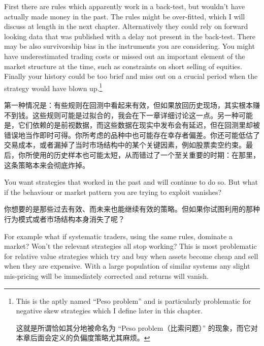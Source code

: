 \begin{englishblock} First there are rules which apparently work in a back-test, but wouldn't have actually made money in the past. The rules might be over-fitted, which I will discuss at length in the next chapter. Alternatively they could rely on forward looking data that was published with a delay not present in the back-test. There may be also survivorship bias in the instruments you are considering. You might have underestimated trading costs or missed out an important element of the market structure at the time, such as constraints on short selling of equities. Finally your history could be too brief and miss out on a crucial period when the strategy would have blown up.\footnote{This is the aptly named ``Peso problem'' and is particularly problematic for negative skew strategies which I define later in this chapter. \par 这就是所谓恰如其分地被命名为 “Peso problem（比索问题）” 的现象，而它对本章后面会定义的负偏度策略尤其麻烦。}\end{englishblock}

\begin{chineseblock}第一种情况是：有些规则在回测中看起来有效，但如果放回历史现场，其实根本赚不到钱。这些规则可能是过拟合的，我会在下一章详细讨论这一点。另一种可能是，它们依赖的是前视数据，而这些数据在现实中发布会有延迟，但在回测里却被错误地当作即时可得。你所考虑的品种中也可能存在幸存者偏差。你还可能低估了交易成本，或者漏掉了当时市场结构中的某个关键因素，例如股票卖空约束。最后，你所使用的历史样本也可能太短，从而错过了一个至关重要的时期：在那里，这条策略本来会彻底炸掉。\end{chineseblock}


\begin{englishblock} You want strategies that worked in the past and will continue to do so. But what if the behaviour or market pattern you are trying to exploit vanishes? \end{englishblock}

\begin{chineseblock}你想要的是那些过去有效、而未来也能继续有效的策略。但如果你试图利用的那种行为模式或者市场结构本身消失了呢？\end{chineseblock}

\bipairgap

\begin{englishblock} For example what if systematic traders, using the same rules, dominate a market? Won't the relevant strategies all stop working? This is most problematic for relative value strategies which try and buy when assets become cheap and sell when they are expensive. With a large population of similar systems any slight mis-pricing will be immediately corrected and returns will vanish. \end{englishblock}

